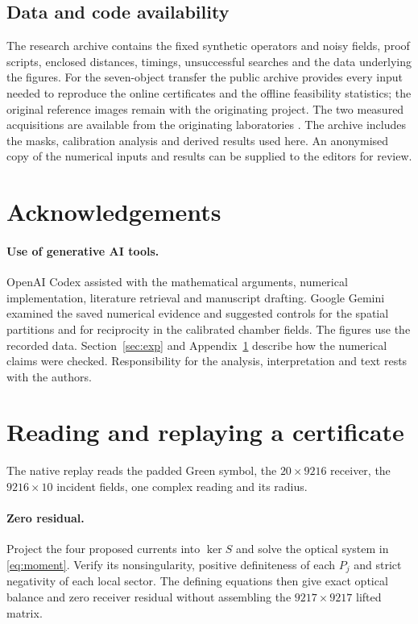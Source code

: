 \documentclass[anonymous,12pt]{iopjournal}
\theoremstyle{remark}\newtheorem{remark}[theorem]{Remark}
\numberwithin{equation}{section}
\begin{document}
\subsection*{Data and code availability}
The research archive contains the fixed synthetic operators and noisy fields, proof scripts, enclosed distances, timings, unsuccessful searches and the data underlying the figures. For the seven-object transfer the public archive provides every input needed to reproduce the online certificates and the offline feasibility statistics; the original reference images remain with the originating project. The two measured acquisitions are available from the originating laboratories \cite{fresnel,manitoba}. The archive includes the masks, calibration analysis and derived results used here. An anonymised copy of the numerical inputs and results can be supplied to the editors for review.

\section*{Acknowledgements}
\paragraph{Use of generative AI tools.} OpenAI Codex assisted with the mathematical arguments, numerical implementation, literature retrieval and manuscript drafting. Google Gemini examined the saved numerical evidence and suggested controls for the spatial partitions and for reciprocity in the calibrated chamber fields. The figures use the recorded data. Section~\ref{sec:exp} and Appendix~\ref{app:replay} describe how the numerical claims were checked. Responsibility for the analysis, interpretation and text rests with the authors.

\appendix
\section{Reading and replaying a certificate}\label{app:replay}

The native replay reads the padded Green symbol, the $20\times9216$ receiver, the $9216\times10$ incident fields, one complex reading and its radius.

\paragraph{Zero residual.}
Project the four proposed currents into $\ker S$ and solve the optical system in \eqref{eq:moment}. Verify its nonsingularity, positive definiteness of each $P_j$ and strict negativity of each local sector. The defining equations then give exact optical balance and zero receiver residual without assembling the $9217\times9217$ lifted matrix.
\end{document}
